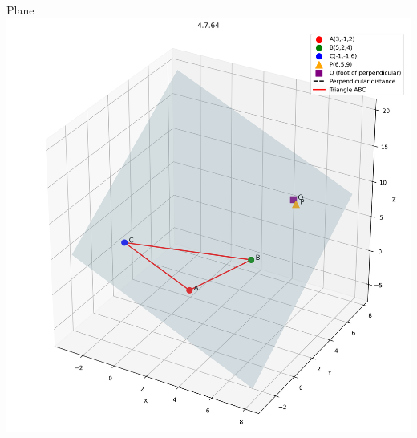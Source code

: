 \documentclass{beamer}
\begin{document}
\begin{frame}{Plane}
   \centering
    \includegraphics[width=\columnwidth, height=0.8\textheight, keepaspectratio]{figs/fig1.png}
    \label{fig:Beamer/figs/fig1.png}
\end{frame}
\end{document}
